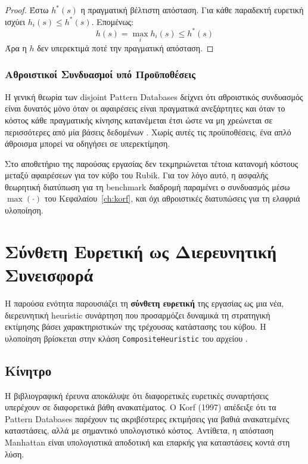 \begin{proof}
Έστω $h^*(s)$ η πραγματική βέλτιστη απόσταση. Για κάθε παραδεκτή ευρετική ισχύει $h_i(s) \leq h^*(s)$. Επομένως:
\begin{equation}
h(s) = \max_i h_i(s) \leq h^*(s)
\end{equation}
Άρα η $h$ δεν υπερεκτιμά ποτέ την πραγματική απόσταση.
\end{proof}

\subsubsection{Αθροιστικοί Συνδυασμοί υπό Προϋποθέσεις}

Η γενική θεωρία των disjoint Pattern Databases δείχνει ότι αθροιστικός
συνδυασμός είναι δυνατός μόνο όταν οι αφαιρέσεις είναι πραγματικά ανεξάρτητες
και όταν το κόστος κάθε πραγματικής κίνησης κατανέμεται έτσι ώστε να μη
χρεώνεται σε περισσότερες από μία βάσεις δεδομένων
\cite{korf2002disjoint,felner2004additive}. Χωρίς αυτές τις προϋποθέσεις, ένα
απλό άθροισμα μπορεί να οδηγήσει σε υπερεκτίμηση.

Στο αποθετήριο της παρούσας εργασίας δεν τεκμηριώνεται τέτοια κατανομή κόστους
μεταξύ αφαιρέσεων για τον κύβο του Rubik. Για τον λόγο αυτό, η ασφαλής θεωρητική
διατύπωση για τη benchmark διαδρομή παραμένει ο συνδυασμός μέσω $\max(\cdot)$
του Κεφαλαίου~\ref{ch:korf}, και όχι αθροιστικές διατυπώσεις για τη
ελαφριά υλοποίηση.

\section{Σύνθετη Ευρετική ως Διερευνητική Συνεισφορά}
\label{sec:composite-heuristic}

Η παρούσα ενότητα παρουσιάζει τη \textbf{σύνθετη ευρετική} της εργασίας ως μια
νέα, διερευνητική heuristic συνάρτηση που προσαρμόζει δυναμικά τη στρατηγική
εκτίμησης βάσει χαρακτηριστικών της τρέχουσας κατάστασης του κύβου.
Η υλοποίηση βρίσκεται στην κλάση \texttt{CompositeHeuristic} του αρχείου
.

\subsection{Κίνητρο}
\label{subsec:composite-motivation}

Η βιβλιογραφική έρευνα αποκάλυψε ότι διαφορετικές ευρετικές συναρτήσεις υπερέχουν σε διαφορετικά βάθη ανακατέματος. Ο Korf (1997) απέδειξε ότι τα Pattern Databases παρέχουν τις ακριβέστερες εκτιμήσεις για βαθιά ανακατεμένες καταστάσεις, αλλά με σημαντικό υπολογιστικό κόστος. Αντίθετα, η απόσταση Manhattan είναι υπολογιστικά αποδοτική και επαρκής για καταστάσεις κοντά στη λύση.

